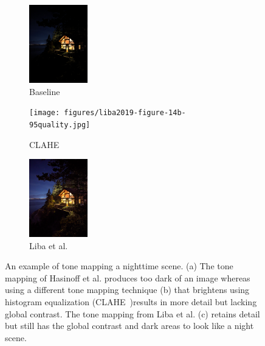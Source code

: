 \documentclass{sig-alternate}
\begin{document}
\begin{figure}
\centering
\begin{subfigure}{1in}
\centering
\includegraphics[width=1in]{figures/liba2019-figure-14a-95quality.jpg}
\caption{Baseline}
\label{fig:toneMapping:baseline}
\end{subfigure}
\begin{subfigure}{1in}
\centering
\texttt{[image: figures/liba2019-figure-14b-95quality.jpg]}
\caption{CLAHE}
\label{fig:toneMapping:clahe}
\end{subfigure}
\begin{subfigure}{1in}
\centering
\includegraphics[width=1in]{figures/liba2019-figure-14c-95quality.jpg}
\caption{Liba et al.}
\label{fig:toneMapping:liba}
\end{subfigure}

\caption{An example of tone mapping a nighttime scene. (a) The tone mapping of Hasinoff et al. \cite{Hasinoff2016} produces too dark of an image whereas using a different tone mapping technique (b) that brightens using histogram equalization (CLAHE~\cite{CLAHE})results in more detail but lacking global contrast. The tone mapping from Liba et al. (c) retains detail but still has the global contrast and dark areas to look like a night scene.~\cite{Liba2019}}


\label{fig:toneMapping}
\end{figure}
\end{document}
